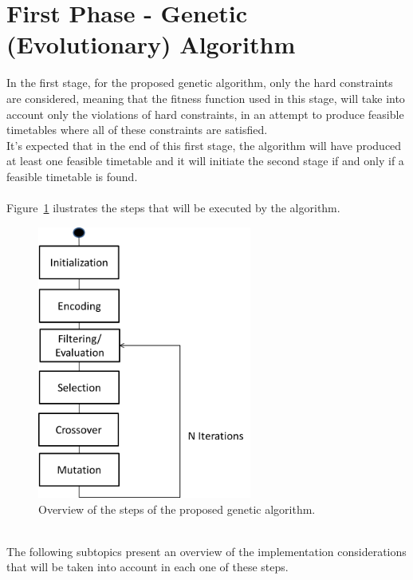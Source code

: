 \section{First Phase - Genetic (Evolutionary) Algorithm}
\label{subsubsec:genetic-algorithm}
In the first stage, for the proposed genetic algorithm, only the hard constraints are considered, meaning that the fitness function used in this stage, will take into account only the violations of hard constraints, in an attempt to produce feasible timetables where all of these constraints are satisfied.\\
It’s expected that in the end of this first stage, the algorithm will have produced at least one feasible timetable and it will initiate the second stage if and only if a feasible timetable is found.\\ 
\\
Figure~\ref{fig:overviewProposedSteps} ilustrates the steps that will be executed by the algorithm.\\
\begin{figure}[h!]
 \centering
   \includegraphics[width=7.05cm]{./images/figures/Fig2_OverviewSteps_GA.png}
   \caption{Overview of the steps of the proposed genetic algorithm.}
   \label{fig:overviewProposedSteps}
\end{figure}\\
The following subtopics present an overview of the implementation considerations that will be taken into account in each one of these steps.\\
